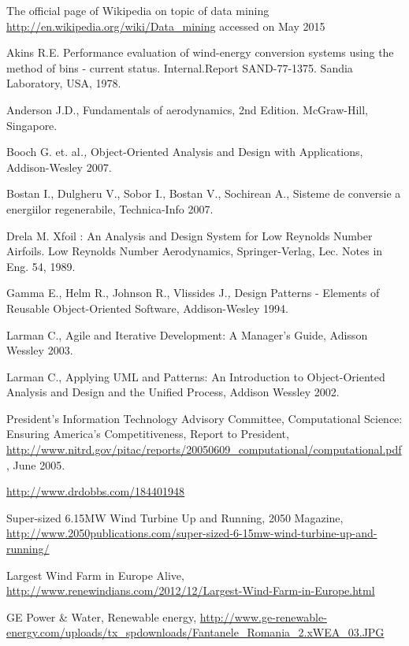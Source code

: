 \begin{thebibliography}{99999}
\singlespace\normalsize

 The official page of Wikipedia on topic of data mining \url{http://en.wikipedia.org/wiki/Data_mining} accessed on May 2015

 Akins R.E. Performance evaluation of wind-energy conversion systems using the method of bins - current status. Internal.Report SAND-77-1375. Sandia Laboratory, USA, 1978. 

Anderson J.D., Fundamentals of aerodynamics, 2nd Edition. McGraw-Hill, Singapore.

 Booch G. et. al\textit{., }Object-Oriented Analysis and Design with
Applications, Addison-Wesley 2007.

Bostan I., Dulgheru V., Sobor I., Bostan V., Sochirean A., Sisteme de
conversie a energiilor regenerabile, Technica-Info 2007.

Drela M. Xfoil : An Analysis and Design System for Low Reynolds Number Airfoils. Low Reynolds Number Aerodynamics, Springer-Verlag, Lec. Notes in Eng. 54, 1989.

 Gamma E., Helm R., Johnson R., Vlissides J.\textit{, }Design Patterns -
Elements of Reusable Object-Oriented Software, Addison-Wesley 1994.

 Larman C., Agile and Iterative Development: A Manager's Guide, Adisson
Wessley 2003.

 Larman C., Applying UML and Patterns: An Introduction to Object-Oriented
Analysis and Design and the Unified Process, Addison Wessley 2002.

 President’s Information Technology Advisory Committee, Computational Science: Ensuring America’s Competitiveness, Report to President, \url{http://www.nitrd.gov/pitac/reports/20050609_computational/computational.pdf}, June 2005. 

 \url{http://www.drdobbs.com/184401948}

Super-sized 6.15MW Wind Turbine Up and Running, 2050 Magazine, \url{http://www.2050publications.com/super-sized-6-15mw-wind-turbine-up-and-running/}

Largest Wind Farm in Europe Alive, \url{http://www.renewindians.com/2012/12/Largest-Wind-Farm-in-Europe.html}

GE Power \& Water, Renewable energy, \url{http://www.ge-renewable-energy.com/uploads/tx_spdownloads/Fantanele_Romania_2.xWEA_03.JPG}



\end{thebibliography}
